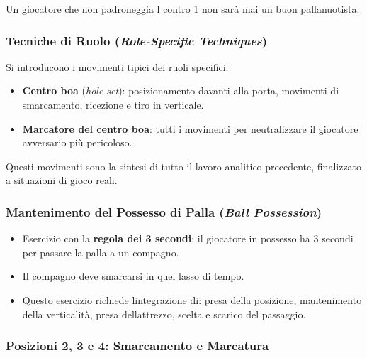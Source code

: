 \documentclass[a4paper,11pt]{article}
\providecommand{\tightlist}{%
  \setlength{\itemsep}{0pt}\setlength{\parskip}{0pt}}
\begin{document}
Un giocatore che non padroneggia l contro 1 non sarà
mai un buon pallanuotista.

\subsubsection{\texorpdfstring{Tecniche di Ruolo (\emph{Role-Specific
                  Techniques})}{Tecniche di Ruolo (Role-Specific Techniques)}}\label{tecniche-di-ruolo-role-specific-techniques}

Si introducono i movimenti tipici dei ruoli specifici:

\begin{itemize}
      \tightlist
      \item
            \textbf{Centro boa} (\emph{hole set}): posizionamento davanti alla
            porta, movimenti di smarcamento, ricezione e tiro in verticale.
      \item
            \textbf{Marcatore del centro boa}: tutti i movimenti per neutralizzare
            il giocatore avversario più pericoloso.
\end{itemize}

Questi movimenti sono la sintesi di tutto il lavoro analitico
precedente, finalizzato a situazioni di gioco reali.

\subsubsection{\texorpdfstring{Mantenimento del Possesso di Palla
            (\emph{Ball
                  Possession})}{Mantenimento del Possesso di Palla (Ball Possession)}}\label{mantenimento-del-possesso-di-palla-ball-possession}

\begin{itemize}
      \tightlist
      \item
            Esercizio con la \textbf{regola dei 3 secondi}: il giocatore in
            possesso ha 3 secondi per passare la palla a un compagno.
      \item
            Il compagno deve smarcarsi in quel lasso di tempo.
      \item
            Questo esercizio richiede l\textquotesingle integrazione di: presa
            della posizione, mantenimento della verticalità, presa
            dell\textquotesingle attrezzo, scelta e scarico del passaggio.
\end{itemize}

\subsubsection{Posizioni 2, 3 e 4: Smarcamento e
      Marcatura}\label{posizioni-2-3-e-4-smarcamento-e-marcatura}
\end{document}

